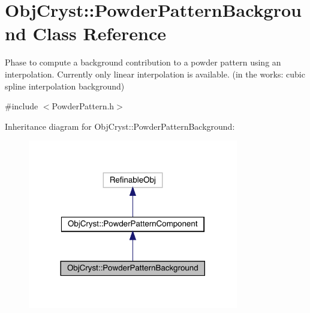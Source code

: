 \hypertarget{class_obj_cryst_1_1_powder_pattern_background}{}\section{Obj\+Cryst\+::Powder\+Pattern\+Background Class Reference}
\label{class_obj_cryst_1_1_powder_pattern_background}


Phase to compute a background contribution to a powder pattern using an interpolation. Currently only linear interpolation is available. (in the works\+: cubic spline interpolation background)  




{\ttfamily \#include $<$Powder\+Pattern.\+h$>$}



Inheritance diagram for Obj\+Cryst\+::Powder\+Pattern\+Background\+:
\nopagebreak
\begin{figure}[H]
\begin{center}
\leavevmode
\includegraphics[width=260pt]{class_obj_cryst_1_1_powder_pattern_background__inherit__graph}
\end{center}
\end{figure}


